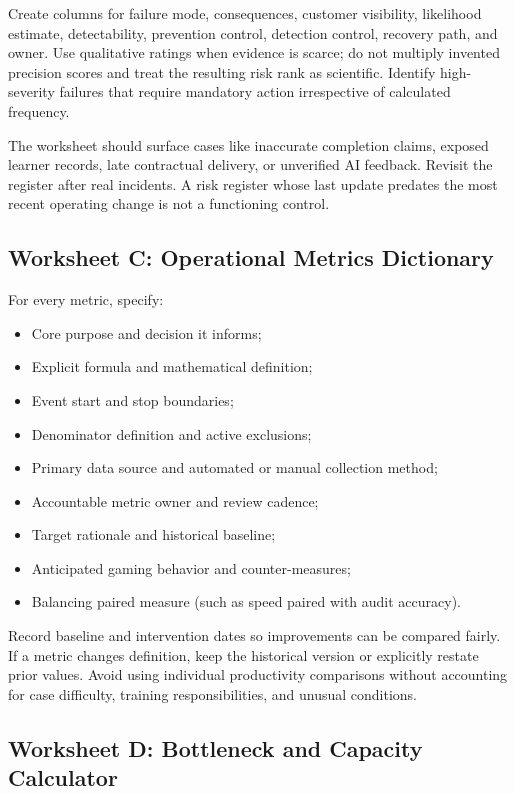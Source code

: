 Create columns for failure mode, consequences, customer visibility, likelihood estimate, detectability, prevention control, detection control, recovery path, and owner. Use qualitative ratings when evidence is scarce; do not multiply invented precision scores and treat the resulting risk rank as scientific. Identify high-severity failures that require mandatory action irrespective of calculated frequency.

The worksheet should surface cases like inaccurate completion claims, exposed learner records, late contractual delivery, or unverified AI feedback. Revisit the register after real incidents. A risk register whose last update predates the most recent operating change is not a functioning control.

\subsection{Worksheet C: Operational Metrics Dictionary}
\label{sec:worksheet_c_metrics_dictionary}

For every metric, specify:
\begin{itemize}
    \item Core purpose and decision it informs;
    \item Explicit formula and mathematical definition;
    \item Event start and stop boundaries;
    \item Denominator definition and active exclusions;
    \item Primary data source and automated or manual collection method;
    \item Accountable metric owner and review cadence;
    \item Target rationale and historical baseline;
    \item Anticipated gaming behavior and counter-measures;
    \item Balancing paired measure (such as speed paired with audit accuracy).
\end{itemize}

Record baseline and intervention dates so improvements can be compared fairly. If a metric changes definition, keep the historical version or explicitly restate prior values. Avoid using individual productivity comparisons without accounting for case difficulty, training responsibilities, and unusual conditions.

\subsection{Worksheet D: Bottleneck and Capacity Calculator}
\label{sec:worksheet_d_capacity_calculator}

